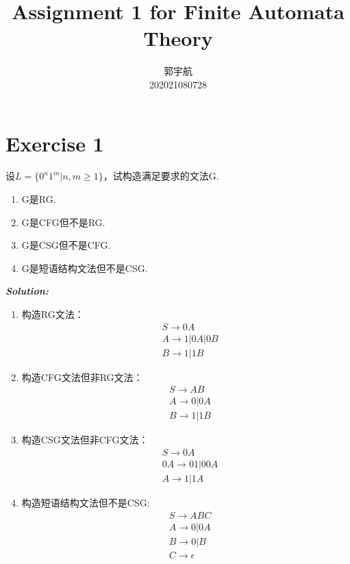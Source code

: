 \documentclass[a4paper]{ctexart}
\title{\textbf{Assignment 1 for Finite Automata Theory}}
\date{}
\author{郭宇航 \\ 202021080728
}
\begin{document}
\maketitle
\section*{Exercise 1}
 设$L=\{0^n1^m|n,m\geq 1\}$，试构造满足要求的文法G.
\begin{enumerate}[(1)]
\item G是RG.
\item G是CFG但不是RG.
\item G是CSG但不是CFG.
\item G是短语结构文法但不是CSG.
\end{enumerate}
\textbf{\emph{Solution:}}
\begin{enumerate}[(1)]
\item 构造RG文法：
\[
\begin{split}
&S\to 0A\\
&A\to 1|0A|0B\\
&B\to 1|1B
\end{split}
\]
\item 构造CFG文法但非RG文法：
\[
\begin{split}
&S\to AB\\
&A\to 0|0A\\
&B\to 1|1B
\end{split}
\]
\item 构造CSG文法但非CFG文法：
\[
\begin{split}
&S\to 0A\\
&0A\to 01|00A\\
&A\to 1|1A
\end{split}
\]
\item 构造短语结构文法但不是CSG:
\[
\begin{split}
&S\to ABC\\
&A\to 0|0A\\
&B\to 0|B\\
&C\to \epsilon
\end{split}
\]
\end{enumerate}
\end{document}
